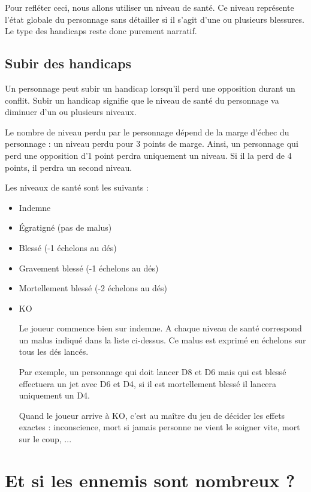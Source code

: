 Pour refléter ceci, nous allons utiliser un niveau de santé. Ce niveau représente l'état globale du personnage sans détailler si il s'agit d'une ou plusieurs blessures. Le type des handicaps reste donc purement narratif.

\subsection{Subir des handicaps}

Un personnage peut subir un handicap lorsqu'il perd une opposition durant un conflit. Subir un handicap signifie que le niveau de santé du personnage va diminuer d'un ou plusieurs niveaux.

Le nombre de niveau perdu par le personnage dépend de la marge d'échec du personnage : un niveau perdu pour 3 points de marge. Ainsi, un personnage qui perd une opposition d'1 point perdra uniquement un niveau. Si il la perd de 4 points, il perdra un second niveau.

Les niveaux de santé sont les suivants :

\begin{itemize}
\item Indemne
\item Égratigné (pas de malus)
\item Blessé (-1 échelons au dés)
\item Gravement blessé (-1 échelons au dés)
\item Mortellement blessé (-2 échelons au dés)
\item KO

Le joueur commence bien sur indemne. A chaque niveau de santé correspond un malus indiqué dans la liste ci-dessus. Ce malus est exprimé en échelons sur tous les dés lancés.

Par exemple, un personnage qui doit lancer D8 et D6 mais qui est blessé effectuera un jet avec D6 et D4, si il est mortellement blessé il lancera uniquement un D4.

Quand le joueur arrive à KO, c'est au maître du jeu de décider les effets exactes : inconscience, mort si jamais personne ne vient le soigner vite, mort sur le coup, ...

\end{itemize}

\section{Et si les ennemis sont nombreux ?}


